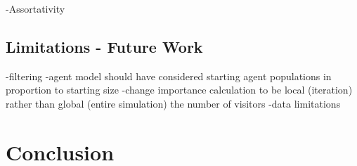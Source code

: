 \documentclass[12pt,a4paper]{thesis}
\begin{document}
-Assortativity

\section{Limitations - Future Work}
-filtering
-agent model should have considered starting agent populations in proportion to starting size
-change importance calculation to be local (iteration) rather than global (entire simulation) the number of visitors
-data limitations


\chapter{Conclusion}

\begin{singlespace}


\end{singlespace}
\end{document}
